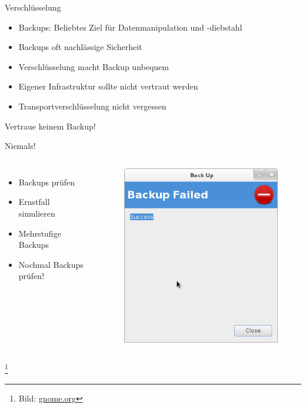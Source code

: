 \documentclass[10pt]{beamer}
\newcommand\blfootnote[1]{%
	\begingroup
	\renewcommand\thefootnote{}\footnote{#1}%
	\addtocounter{footnote}{-1}%
	\endgroup
}
\begin{document}
%
%
\begin{frame}[fragile]{Verschlüsselung}
	\begin{itemize}
	\item Backups: Beliebtes Ziel für Datenmanipulation und -diebstahl
	\item Backups oft nachlässige Sicherheit
	\item Verschlüsselung macht Backup unbequem
	\item Eigener Infrastruktur sollte nicht vertraut werden
	\item Transportverschlüsselung nicht vergessen
\end{itemize}
\end{frame}

%
%
\begin{frame}[fragile]{Vertraue keinem Backup!}
\begin{alertblock}{Niemals!}
\end{alertblock}
\begin{columns}[T,c,onlytextwidth]
	\begin{itemize}
		\item Backups prüfen
		\item Ernstfall simulieren
		\item Mehrstufige Backups
		\item Nochmal Backups prüfen!
	\end{itemize}
	\begin{figure}
		\includegraphics[width=1\textwidth]{images/failed-backup}
	\end{figure}
\end{columns}

\blfootnote{Bild: \href{https://mail.gnome.org/archives/deja-dup-list/2012-November/msg00000.html}{gnome.org}}
\end{frame}
\end{document}
